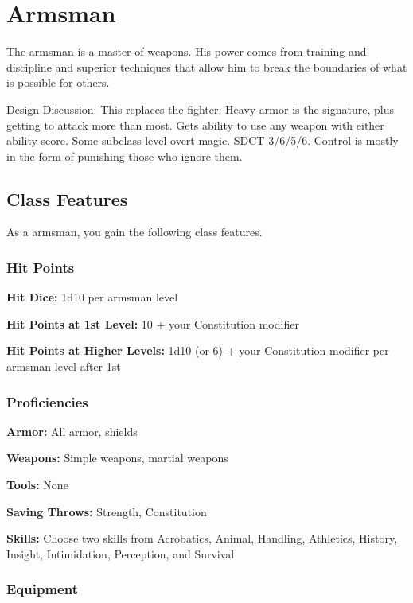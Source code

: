 \section{Armsman}

The armsman is a master of weapons. His power comes from training and discipline and superior techniques that allow him to break the boundaries of what is possible for others.

Design Discussion: This replaces the fighter. Heavy armor is the signature, plus getting to attack more than most. Gets ability to use any weapon with either ability score. Some subclass-level overt magic. SDCT 3/6/5/6. Control is mostly in the form of punishing those who ignore them.

\subsection{Class Features}

As a armsman, you gain the following class features.

\subsubsection{Hit Points}

\textbf{Hit Dice:} 1d10 per armsman level

\textbf{Hit Points at 1st Level:} 10 + your Constitution modifier

\textbf{Hit Points at Higher Levels:} 1d10 (or 6) + your Constitution modifier per armsman level after 1st

\subsubsection{Proficiencies}

\textbf{Armor:} All armor, shields

\textbf{Weapons:} Simple weapons, martial weapons

\textbf{Tools:} None

\textbf{Saving Throws:} Strength, Constitution

\textbf{Skills:} Choose two skills from Acrobatics, Animal, Handling, Athletics, History, Insight, Intimidation, Perception, and Survival

\subsubsection{Equipment}

